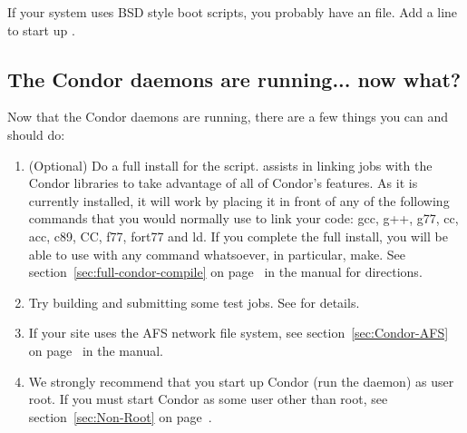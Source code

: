 If your system uses BSD style boot scripts, you probably have an
 file.  Add a line to start up
.


\subsection{\label{sec:Running-Now-What}The Condor daemons are
running... now what?} 

Now that the Condor daemons are running, there are a few things you
can and should do:

\begin{enumerate}
\item (Optional) Do a full install for the  script.
     assists in linking jobs with the Condor libraries
    to take advantage of all of Condor's features.  As it is currently
    installed, it will work by placing it in front of any of the
    following commands that you would normally use to link your code:
    gcc, g++, g77, cc, acc, c89, CC, f77, fort77 and ld.  If you
    complete the full install, you will be able to use
     with any command whatsoever, in particular, make.
    See section~\ref{sec:full-condor-compile} on
    page~\pageref{sec:full-condor-compile} in the manual for
    directions.

\item Try building and submitting some test jobs.  See
     for details.

\item If your site uses the AFS network file system, see
section~\ref{sec:Condor-AFS} on page~\pageref{sec:Condor-AFS} in the
manual.

\item We strongly recommend that you start up Condor (run the
 daemon) as user root.  If you must start Condor as
some user other than root, see section~\ref{sec:Non-Root} on
page~\pageref{sec:Non-Root}.

\end{enumerate}
